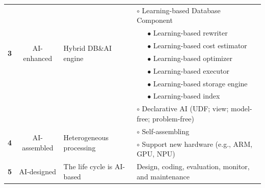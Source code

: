\begin{table}[!t]
{\begin{tabular}{|c|c|l|l|}
\multirow{7}{*}{\textbf{3}} & \multirow{7}{*}{AI-enhanced} & \multirow{7}{*}{Hybrid DB\&AI engine} &$\circ$ Learning-based Database Component \\
 &  & &\ \ \  $\bullet$ Learning-based rewriter\\
 &  & &\ \ \  $\bullet$ Learning-based cost estimator\\
 &  & &\ \ \  $\bullet$ Learning-based optimizer\\
 &  & &\ \ \  $\bullet$ Learning-based executor\\
 &  & &\ \ \  $\bullet$ Learning-based storage engine\\
  &  & &\ \ \  $\bullet$ Learning-based index\\
 &  & &$\circ$ Declarative AI (UDF; view; model-free; problem-free) \\\hline
\multirow{2}{*}{\textbf{4}} & \multirow{2}{*}{AI-assembled} & \multirow{2}{*}{Heterogeneous processing} & $\circ$ Self-assembling\\
&  & & $\circ$ Support new hardware (e.g., ARM, GPU, NPU)\\\hline


\multirow{1}{*}{\textbf{5}} & \multirow{1}{*}{AI-designed} & \multirow{1}{*}{The life cycle is AI-based} &Design, coding, evaluation, monitor, 
and maintenance \\\hline
  \end{tabular}
}
\vspace{-1em}
\end{table}


